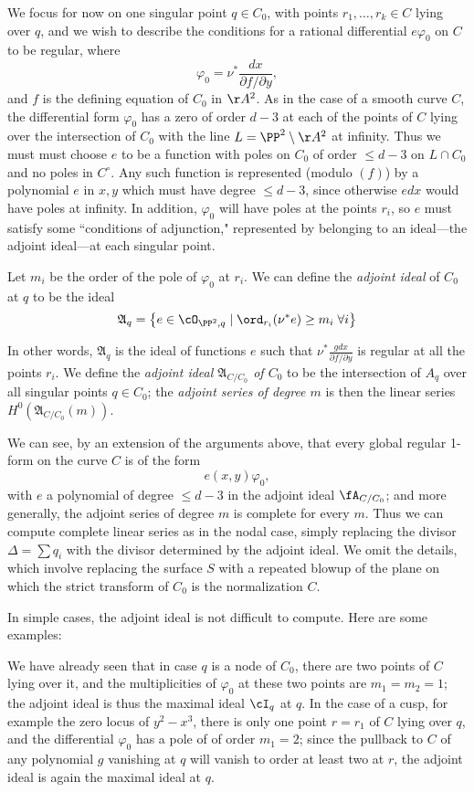 We focus for now on one singular point $q \in C_0$, with points $r_1,\dots,r_k \in C$ lying over $q$, and we wish to describe the conditions for a rational differential $e\varphi_0$ on $C$ to be regular, where
$$
\varphi_0 = \nu^* \frac{dx}{\partial f/\partial y},
$$
and $f$ is the defining equation of $C_0$ in $\AA^2$. As in the case of a smooth curve $C$, the differential
form $\varphi_0$ has a zero of order $d-3$ at each of the points of $C$ lying over the intersection of $C_0$ with the line  $L = \PP^2\setminus \AA^2$
at infinity. Thus we must must choose $e$ to be a function with poles on $C_0$ of order $\leq d-3$ on $L\cap C_0$ and no poles in $C^\circ$. Any such function is represented (modulo $(f)$) by 
a polynomial $e$ in $x,y$ which must have degree $\leq d-3$, since otherwise $edx$ would have poles at infinity. In addition, $\varphi_0$ will have poles at the points $r_i$,
so $e$ must satisfy some ``conditions of adjunction," represented by belonging to an ideal---the adjoint ideal---at each singular point.

Let $m_i$ be the order of the pole of $\varphi_0$ at $r_i$. We can define the \emph{adjoint ideal} of $C_0$ at $q$ to be the ideal
$$
\mathfrak A_{q} = \left\{ e \in \cO_{\PP^2, q} \mid \ord_{r_i}(\nu^*e) \geq m_i \; \forall i \right\}
$$

In other words, $\mathfrak A_q$ is the ideal of functions $e$ such that $\nu^* \frac{gdx}{\partial f/\partial y}$ is regular at all the points $r_i$. We define the \emph{adjoint ideal $\mathfrak A_{C/C_0}$ of $C_0$} to be the intersection of $A_q$ over all singular points  $q \in C_0$; the \emph{adjoint series of degree $m$} is then the linear series $H^0(\mathfrak A_{C/C_0}(m))$. 

We can see, by an extension of the arguments above,  that every global regular 1-form on the curve $C$ is of the form 
$$
e(x,y) \varphi_0,
$$
with $e$ a polynomial of degree $\leq d-3$ in the adjoint ideal $\fA_{C/C_0}$; and more generally, the adjoint series of degree $m$ is complete for every $m$. Thus  we can compute complete linear series as in the nodal case, simply replacing
the divisor $\Delta = \sum q_i$ with the divisor determined by the adjoint ideal. We omit the details, which involve replacing
the surface $S$ with a repeated blowup of the plane on which the strict transform of $C_0$ is the normalization $C$.

In simple cases, the adjoint ideal is not difficult to compute. Here are some examples:


\begin{example}
We have already seen that in case $q$ is a node of $C_0$, there are two points of $C$ lying over it, and the multiplicities of $\varphi_0$ at these two points are $m_1=m_2=1$; the adjoint ideal is thus 
 the maximal ideal $\cI_q$ at $q$. In the case of a cusp, for example the zero locus of $y^2-x^3$, there is only one point $r=r_1$ of $C$ lying over $q$, and the differential $\varphi_0$ has a pole of of order $m_1=2$; since the pullback to $C$ of any polynomial $g$ vanishing at $q$ will vanish to order at least two at $r$, the adjoint ideal is again the maximal ideal at $q$.
\end{example}

